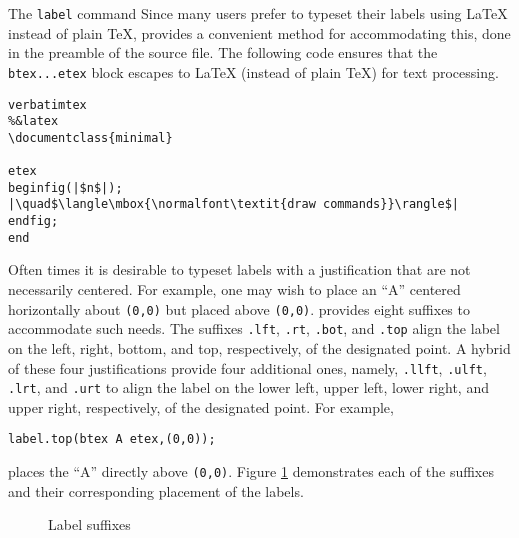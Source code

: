 \begin{subsection}{The \texttt{label} command}
Since many \MP{} users prefer to typeset their labels using \LaTeX{} instead of plain \TeX, \MP{} provides a convenient method for accommodating this, done in the preamble of the \MP{} source file.  The following code ensures that the \verb|btex...etex| block escapes to \LaTeX{} (instead of plain \TeX) for text processing.
\begin{lstlisting}[xleftmargin=56bp]
verbatimtex
%&latex
\documentclass{minimal}

etex
beginfig(|$n$|);
|\quad$\langle\mbox{\normalfont\textit{draw commands}}\rangle$|
endfig;
end
\end{lstlisting}

Often times it is desirable to typeset labels with a justification that are not necessarily centered.  For example, one may wish to place an ``A'' centered horizontally about \texttt{(0,0)} but placed above \texttt{(0,0)}. \MP{} provides eight suffixes to accommodate such needs.  The suffixes \texttt{.lft}, \texttt{.rt}, \texttt{.bot}, and \texttt{.top} align the label on the left, right, bottom, and top, respectively, of the designated point.  A hybrid of these four justifications provide four additional ones, namely, \texttt{.llft}, \texttt{.ulft}, \texttt{.lrt}, and \texttt{.urt} to align the label on the lower left, upper left, lower right, and upper right, respectively, of the designated point.  For example, \begin{center}\verb|label.top(btex A etex,(0,0));|\end{center} places the ``A'' directly above \texttt{(0,0)}.  Figure \ref{fig:label} demonstrates each of the suffixes and their corresponding placement of the labels.
\begin{figure}[hptb]
	\begin{center}\hfill{}\hfill{}\hfill\mbox{}\end{center}
	\caption{Label suffixes}\label{fig:label}
\end{figure}

\end{subsection}
